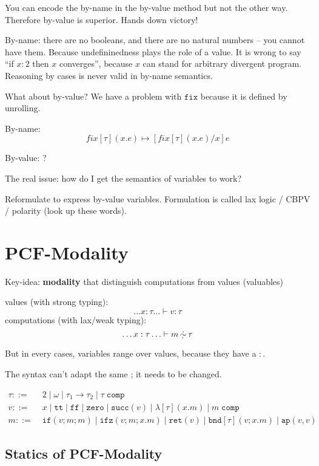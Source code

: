 \documentclass[11pt]{article}
\newcommand{\entails}{\ensuremath{\vdash}}
\newcommand{\dsym}{\ensuremath{\,\underaccent{\dot}{\dot{\sim}}\,}}
\newcommand{\Ltt}{\ensuremath{\mathtt{tt}}}
\newcommand{\Lff}{\ensuremath{\mathtt{ff}}}
\newcommand{\Lcomp}[1]{\ensuremath{#1\;\mathtt{comp}}}
\newcommand{\Lzero}{\ensuremath{\mathtt{zero}}}
\newcommand{\Lsucc}[1]{\ensuremath{\mathtt{succ}(#1)}}
\newcommand{\Lif}[3]{\ensuremath{\mathtt{if}(#1 ; #2 ; #3)}}
\newcommand{\Lifz}[3]{\ensuremath{\mathtt{ifz}(#1 ; #2 ; #3)}}
\newcommand{\Llam}[3][\tau]{\ensuremath{\lambda[#1](#2 . #3)}}
\newcommand{\Lap}[2]{\ensuremath{\mathtt{ap}(#1, #2)}}
\newcommand{\Lbind}{\ensuremath{\mathtt{bnd}}}
\newcommand{\rret}{\ensuremath{\mathtt{ret}}}
\newcommand{\LBnd}[3][\tau]{\ensuremath{\Lbind[#1](#2; #3)}}
\begin{document}
You can encode the by-name in the by-value method but not the other way.
Therefore by-value is superior. Hands down victory!

By-name: there are no booleans, and there are no natural numbers -- you
cannot have them.  Because undefininedness plays the role of a value.
It is wrong to say ``if $x : 2$ then $x$ converges'', because $x$ can stand for arbitrary divergent program.
Reasoning by cases is never valid in by-name semantics.

\vspace{1em}

What about by-value?
We have a problem with $\texttt{fix}$ because it is defined by unrolling.

By-name: $$fix[\tau](x.e)\mapsto [fix[\tau](x.e) / x]e$$

By-value: ?

The real issue: how do I get the semantics of variables to work?

Reformulate to express by-value variables.  Formulation is called lax
logic / CBPV / polarity (look up these words).

\section{PCF-Modality}

Key-idea: \textbf{modality} that distinguish computations from values (valuables)

values (with strong typing): $$\dots x : \tau \dots \entails v : \tau$$
computations (with lax/weak typing): $$\dots x : \tau \dots \entails m
\dsym \tau$$

But in every cases, variables range over values, because they have a
$\colon$.

The syntax can't adapt the same ; it needs to be changed.

\begin{align*}
  \tau ::= &\; 2 \mid \omega \mid \tau_{1}\rightarrow\tau_{2} \mid \Lcomp \tau
  \\
  v ::= &\; x \mid \Ltt \mid \Lff \mid \Lzero \mid \Lsucc v \mid \Llam{x}{m} \mid \Lcomp{m} \\
  m ::= &\; \Lif{v}{m}{m} \mid
            \Lifz{v}{m}{x.m} \mid
            \rret(v) \mid
            \LBnd{v}{x.m} \mid
            \Lap{v}{v}
\end{align*}

\subsection{Statics of PCF-Modality}
\label{sec:statics}
\end{document}
